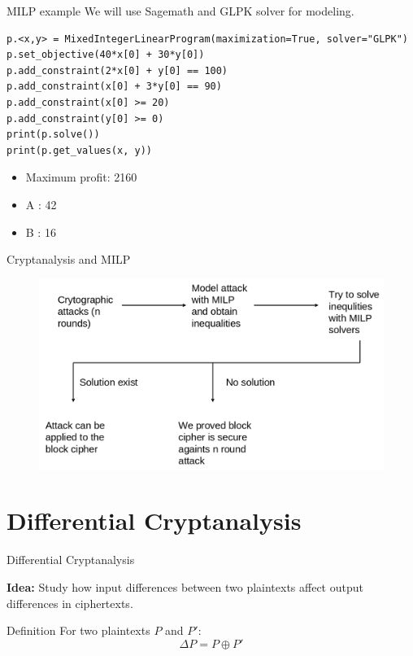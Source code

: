 \documentclass{beamer}
\begin{document}
\begin{frame}[fragile]{MILP example}
We will use Sagemath and GLPK solver for modeling.

  

\begin{lstlisting}
p.<x,y> = MixedIntegerLinearProgram(maximization=True, solver="GLPK")
p.set_objective(40*x[0] + 30*y[0])
p.add_constraint(2*x[0] + y[0] == 100)
p.add_constraint(x[0] + 3*y[0] == 90)
p.add_constraint(x[0] >= 20)
p.add_constraint(y[0] >= 0)
print(p.solve())
print(p.get_values(x, y))
\end{lstlisting}

\begin{itemize}
    \item Maximum profit: 2160
    \item A : 42
    \item B : 16
\end{itemize}
    
\end{frame}

\begin{frame}{Cryptanalysis and MILP}

    \begin{figure}
        \centering
        \includegraphics[width=0.75\linewidth]{fig/Screenshot from 2025-08-28 11-42-41.png}
    \end{figure}
    
\end{frame}

\section{Differential Cryptanalysis}


\begin{frame}{Differential Cryptanalysis}
  
\textbf{Idea:}  
Study how input differences between two plaintexts affect output differences in ciphertexts.

\begin{block}{Definition}
For two plaintexts $P$ and $P'$:  
\[
\Delta P = P \oplus P'
\]
\end{block}




\end{frame}
\end{document}

